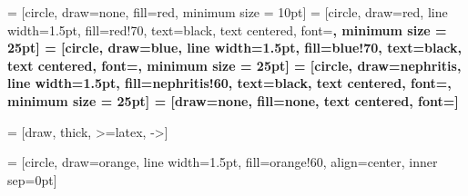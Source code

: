 

 = [circle, draw=none, fill=red, minimum size = 10pt]
 = [circle, draw=red, line width=1.5pt, fill=red!70, text=black, text centered, font=\bf \normalsize, minimum size = 25pt]
 = [circle, draw=blue, line width=1.5pt, fill=blue!70, text=black, text centered, font=\bf \normalsize, minimum size = 25pt]
 = [circle, draw=nephritis, line width=1.5pt, fill=nephritis!60, text=black, text centered, font=\bf \normalsize, minimum size = 25pt]
 = [draw=none, fill=none, text centered, font=\bf \normalsize]

  = [draw, thick, >=latex, ->]

 = [circle, draw=orange, line width=1.5pt, fill=orange!60, align=center, inner sep=0pt]

